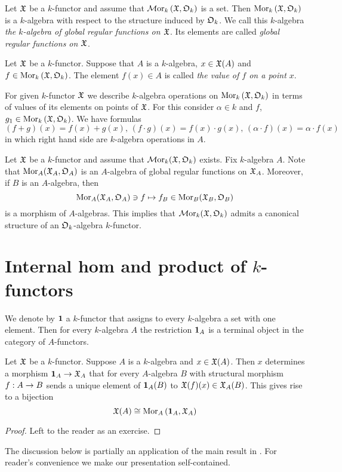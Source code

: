 \begin{definition}
Let ${\mathfrak X}$ be a $k$-functor and assume that $\mathcal{M}\mathrm{or}_k\left({\mathfrak X}, {\mathfrak O}_k\right)$ is a set. Then $\mathrm{Mor}_k\left({\mathfrak X}, {\mathfrak O}_k\right)$ is a $k$-algebra with respect to the structure induced by ${\mathfrak O}_k$. We call this $k$-algebra \textit{the $k$-algebra of global regular functions on ${\mathfrak X}$}. Its elements are called \textit{global regular functions on ${\mathfrak X}$}.
\end{definition}

\begin{definition}
Let ${\mathfrak X}$ be a $k$-functor. Suppose that $A$ is a $k$-algebra, $x\in {\mathfrak X}(A)$ and $f\in \mathrm{Mor}_k\left({\mathfrak X},{\mathfrak O}_k\right)$. The element $f(x) \in A$ is called \textit{the value of $f$ on a point $x$}.
\end{definition}
\noindent
For given $k$-functor ${\mathfrak X}$ we describe $k$-algebra operations on $\mathrm{Mor}_k\left({\mathfrak X},{\mathfrak O}_k\right)$ in terms of values of its elements on points of ${\mathfrak X}$. For this consider $\alpha \in k$ and $f$, $g_1\in \mathrm{Mor}_k\left({\mathfrak X}, {\mathfrak O}_k\right)$. We have formulas
$$\left(f+g\right)(x) = f(x)+g(x),\,\left(f\cdot g\right)(x) = f(x)\cdot g(x),\,\left(\alpha \cdot f\right)(x) = \alpha \cdot f(x)$$
in which right hand side are $k$-algebra operations in $A$.

\begin{example}\label{example:regular_functions_as_an_algebra_over_structure_algebra}
Let ${\mathfrak X}$ be a $k$-functor and assume that $\mathcal{M}\mathrm{or}_k({\mathfrak X},{\mathfrak O}_k)$ exists. Fix $k$-algebra $A$. Note that $\mathrm{Mor}_A({\mathfrak X}_A,{\mathfrak O}_A)$ is an $A$-algebra of global regular functions on ${\mathfrak X}_A$. Moreover, if $B$ is an $A$-algebra, then
$$\mathrm{Mor}_A({\mathfrak X}_A,{\mathfrak O}_A) \ni f \mapsto f_B\in \mathrm{Mor}_B({\mathfrak X}_B,{\mathfrak O}_B)$$
is a morphism of $A$-algebras. This implies that $\mathcal{M}\mathrm{or}_k({\mathfrak X},{\mathfrak O}_k)$ admits a canonical structure of an ${\mathfrak O}_k$-algebra $k$-functor.
\end{example}

\section{Internal hom and product of $k$-functors}
\noindent
We denote by $\mathbf{1}$ a $k$-functor that assigns to every $k$-algebra a set with one element. Then for every $k$-algebra $A$ the restriction $\mathbf{1}_A$ is a terminal object in the category of $A$-functors.

\begin{fact}\label{fact:points_and_morphisms_from_terminal_k_functor}
Let ${\mathfrak X}$ be a $k$-functor. Suppose $A$ is a $k$-algebra and $x\in {\mathfrak X}(A)$. Then $x$ determines a morphism $\mathbf{1}_{A}\rightarrow {\mathfrak X}_A$ that for every $A$-algebra $B$ with structural morphism $f:A\rightarrow B$ sends a unique element of $\mathbf{1}_{A}(B)$ to ${\mathfrak X}(f)(x)\in {\mathfrak X}_A(B)$. This gives rise to a bijection
$${\mathfrak X}(A)\cong \mathrm{Mor}_{A}\left(\mathbf{1}_{A},{\mathfrak X}_A\right)$$
\end{fact}
\begin{proof}
Left to the reader as an exercise.
\end{proof}
\noindent
The discussion below is partially an application of the main result in {\cite[section 6]{Presheaves}}. For reader's convenience we make our presentation self-contained.

